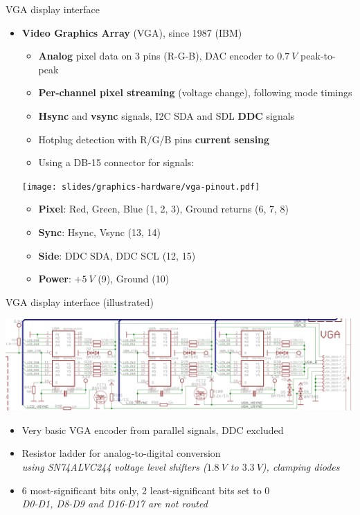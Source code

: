 \begin{frame}{VGA display interface}
  \begin{itemize}
  \item \textbf{Video Graphics Array} (VGA), since 1987 (IBM)
    \begin{itemize}
    \item \textbf{Analog} pixel data on 3 pins (R-G-B), DAC encoder to \(0.7~V\) peak-to-peak
    \item \textbf{Per-channel pixel streaming} (voltage change), following mode timings
    \item \textbf{Hsync} and \textbf{vsync} signals, I2C SDA and SDL \textbf{DDC} signals
    \item Hotplug detection with R/G/B pins \textbf{current sensing}
    \item Using a DB-15 connector for signals:
    \end{itemize}
  \begin{center}
    \texttt{[image: slides/graphics-hardware/vga-pinout.pdf]}
  \end{center}
  \begin{itemize}
  \item \textbf{Pixel}: Red, Green, Blue {\footnotesize(1, 2, 3)}, Ground returns {\footnotesize(6, 7, 8)}
  \item \textbf{Sync}: Hsync, Vsync {\footnotesize(13, 14)}
  \item \textbf{Side}: DDC SDA, DDC SCL {\footnotesize(12, 15)}
  \item \textbf{Power}: \(+5~V\) {\footnotesize(9)}, Ground {\footnotesize(10)}
  \end{itemize}
  \end{itemize}

\end{frame}

\begin{frame}{VGA display interface (illustrated)}
  \begin{center}
    \includegraphics[width=\textwidth]{slides/graphics-hardware/a13-olinuxino-vga.png}
  \end{center}

  \begin{itemize}
  \item Very basic VGA encoder from parallel signals, DDC excluded
  \item Resistor ladder for analog-to-digital conversion\\
  \textit{using SN74ALVC244 voltage level shifters (\(1.8~V\) to \(3.3~V\)), clamping diodes}
  \item 6 most-significant bits only, 2 least-significant bits set to 0\\
  \textit{D0-D1, D8-D9 and D16-D17 are not routed}
  \end{itemize}
\end{frame}

